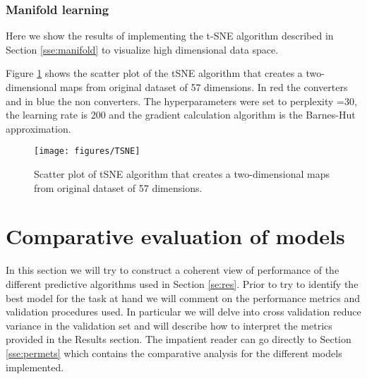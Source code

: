 \documentclass[11pt]{article}
\theoremstyle{definition}
\theoremstyle{remark}
\begin{document}
\subsubsection{Manifold learning}
\label{sse:resmanifold}
Here we show the results of implementing the t-SNE algorithm described in Section \ref{sse:manifold} to visualize high dimensional data space.


Figure \ref{fig:TSNE} shows the scatter plot of the tSNE algorithm that creates a two-dimensional maps from original dataset of 57 dimensions. In red the converters and in blue the non converters. The hyperparameters were set to perplexity =30, the learning rate is 200 and the  gradient calculation algorithm is the Barnes-Hut approximation.

\begin{figure}[H] 
        \centering
        \texttt{[image: figures/TSNE]}
        \caption{Scatter plot of tSNE algorithm that creates a two-dimensional maps from original dataset of 57 dimensions. 
        } \label{fig:TSNE}
\end{figure}


\section{Comparative evaluation of models}
\label{se:compare}
In this section we will try to construct a coherent view of performance of the different predictive algorithms used in Section \ref{se:res}.
Prior to try to identify the best model for the task at hand we will comment on the performance metrics and validation procedures used. In particular we will delve into cross validation reduce variance in the validation set and will describe how to interpret the metrics provided in the Results section. The impatient reader can go directly to Section \ref{sse:permets} which contains the comparative analysis for the different models implemented.
\end{document}
